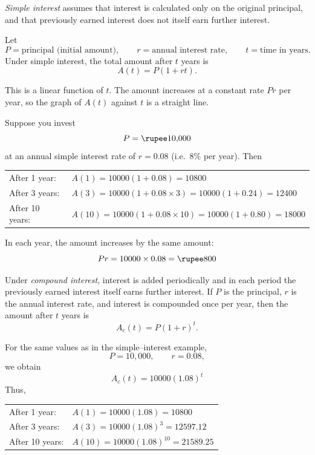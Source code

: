\emph{Simple interest}
assumes that interest is calculated only on the original principal, and
that previously earned interest does not itself earn further interest.

Let
\[
P = \text{principal (initial amount)}, \qquad
r = \text{annual interest rate}, \qquad
t = \text{time in years}.
\]
Under simple interest, the total amount after $t$ years is
\[
A(t) = P(1 + rt).
\]

This is a linear function of $t$.  The amount increases at a constant
rate $Pr$ per year, so the graph of $A(t)$ against $t$ is a straight line.

\begin{example}
Suppose you invest
\[
P = \mbox{\rupee}10{,}000 
\]
at an annual simple interest rate of $r = 0.08$ (i.e.\ 8\% per year). Then

\vspace{0.25in}
\begin{tabular}{ll}
\hline
After 1 year: &  $A(1) = 10000(1 + 0.08) = 10800$ \\
After 3 years: &  $A(3) = 10000(1 + 0.08\times 3) = 10000(1 + 0.24) = 12400$ \\
After 10 years: & $A(10) = 10000(1 + 0.08\times 10)  = 10000(1 + 0.80) = 18000$ \\
\hline
\end{tabular}
\vspace{0.25in}

In each year, the amount increases by the same amount:
\[
Pr = 10000\times 0.08 = \mbox{\rupee} 800 
\]
\end{example}


Under \emph{compound interest}, interest is added periodically and in each period
the previously earned interest itself earns further interest.  If $P$ is
the principal, $r$ is the annual interest rate, and interest is compounded
once per year, then the amount after $t$ years is
\[
A_c(t) = P(1+r)^{t}.
\]

\begin{example}
For the same values as in the simple–interest example,
\[
P = 10{,}000,\qquad r = 0.08,
\]
we obtain
\[
A_c(t)=10000(1.08)^t
\]
Thus,

\vspace{0.25in}
\begin{tabular}{ll}
\hline
After 1 year: &  $A(1) = 10000(1.08) = 10800$ \\
After 3 years: &  $A(3) = 10000(1.08)^3 = 12597.12 $ \\
After 10 years: & $A(10) = 10000(1.08)^10  = 21589.25$ \\
\hline
\end{tabular}
\vspace{0.25in}

\end{example}


